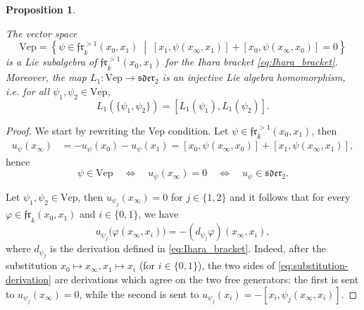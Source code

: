 \documentclass[10pt,a4paper]{amsart}
\newtheorem{proposition}{Proposition}
\newcommand{\frone}{\mathfrak{fr}^{>1}_k(x_0,x_1)}
\begin{document}
\begin{proposition}\label{prop:Hex-Lie-subalgebra}


The vector space
\[
\mathrm{Vep}
=
\left\{
\psi\in\mathfrak{fr}^{>1}_k(x_0,x_1)
\;\middle|\;
[x_1,\psi(x_\infty,x_1)]
+
[x_0,\psi(x_\infty,x_0)]
=0
\right\}
\]
is a Lie subalgebra of $\frone$ for the Ihara bracket \eqref{eq:Ihara_bracket}.
Moreover, the map
$L_1:
\mathrm{Vep}\to\mathfrak{sder}_2$ is an injective Lie algebra homomorphism, %
i.e. for all \(\psi_1,\psi_2\in\mathrm{Vep}\),
\[
L_1(\{\psi_1,\psi_2\}) = [L_1(\psi_1),L_1(\psi_2)].
\]
\end{proposition}

\begin{proof}
We start by rewriting the Vep condition. Let 
\(\psi\in\mathfrak{fr}^{>1}_k(x_0,x_1)\), then
\begin{align*}
u_\psi(x_\infty)
&=
-u_\psi(x_0)-u_\psi(x_1)=
[x_0,\psi(x_\infty,x_0)]
+[x_1,\psi(x_\infty,x_1)],
\end{align*}
hence
\[
\psi\in\mathrm{Vep}
\quad\Longleftrightarrow\quad
u_\psi(x_\infty)=0
\quad\Longleftrightarrow\quad
u_\psi\in\mathfrak{sder}_2.
\]

Let \(\psi_1,\psi_2\in \mathrm{Vep}\), then \(u_{\psi_j}(x_\infty)=0\)
for $j \in \{1,2\}$ and it follows that for 
every
\(\varphi\in\mathfrak{fr}_k(x_0,x_1)\) and
\(i\in\{0,1\}\), we have
\begin{equation}\label{eq:substitution-derivation}
u_{\psi_j}\bigl(\varphi(x_\infty,x_i)\bigr)
=
-(d_{\psi_j}\varphi)(x_\infty,x_i),
\end{equation}
where $d_{\psi_j}$ is the derivation defined in \eqref{eq:Ihara_bracket}.
Indeed, after the substitution $x_0 \mapsto x_\infty, x_1 \mapsto x_i$ (for $i\in \{0,1\}$), the two sides of
\eqref{eq:substitution-derivation} are derivations which agree on the two free
generators: the first is sent to
\(u_{\psi_j}(x_\infty)=0\), while the second is sent to
$u_{\psi_j}(x_i)
= -[x_i,\psi_j(x_\infty,x_i)].$


\end{proof}
\end{document}
